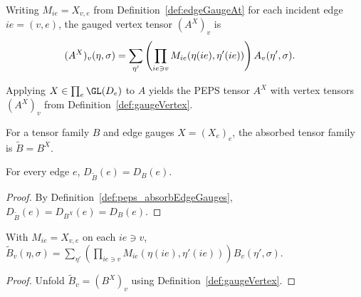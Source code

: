 \begin{definition}%
    \label{def:gaugeVertex}
    \leanok
    Writing $M_{ie}=X_{v,e}$ from Definition~\ref{def:edgeGaugeAt} for each
    incident edge $ie=(v,e)$, the gauged vertex tensor $(A^X)_v$ is
    \begin{align}
        (A^X)_v(\eta,\sigma)
         & =
        \sum_{\eta'}
        \left(\prod_{ie\ni v}
        M_{ie}(\eta(ie),\eta'(ie))\right)A_v(\eta',\sigma).
        \notag
    \end{align}
\end{definition}

\begin{definition}%
    \label{def:applyGauge}
    \leanok
    Applying $X\in\prod_e\GL(D_e)$ to $A$ yields the PEPS tensor $A^X$ with
    vertex tensors $(A^X)_v$ from Definition~\ref{def:gaugeVertex}.
\end{definition}

\begin{definition}%
    \label{def:peps_absorbEdgeGauges}
    \leanok
    For a tensor family $B$ and edge gauges $X=(X_e)_e$, the absorbed tensor
    family is $\widetilde B=B^X$.
\end{definition}

\begin{lemma}%
    \label{thm:peps_absorbEdgeGauges_bondDim}
    \leanok
    For every edge $e$, $D_{\widetilde B}(e)=D_B(e)$.
\end{lemma}
\begin{proof}\leanok
    By Definition~\ref{def:peps_absorbEdgeGauges},
    $D_{\widetilde B}(e)=D_{B^X}(e)=D_B(e)$.
\end{proof}

\begin{lemma}%
    \label{thm:peps_absorbEdgeGauges_component}
    \leanok
    With $M_{ie}=X_{v,e}$ on each $ie\ni v$,
    $\widetilde B_v(\eta,\sigma)
        =\sum_{\eta'}(\prod_{ie\ni v}M_{ie}(\eta(ie),\eta'(ie)))
        B_v(\eta',\sigma)$.
\end{lemma}
\begin{proof}\leanok
    Unfold $\widetilde B_v=(B^X)_v$ using Definition~\ref{def:gaugeVertex}.
\end{proof}

